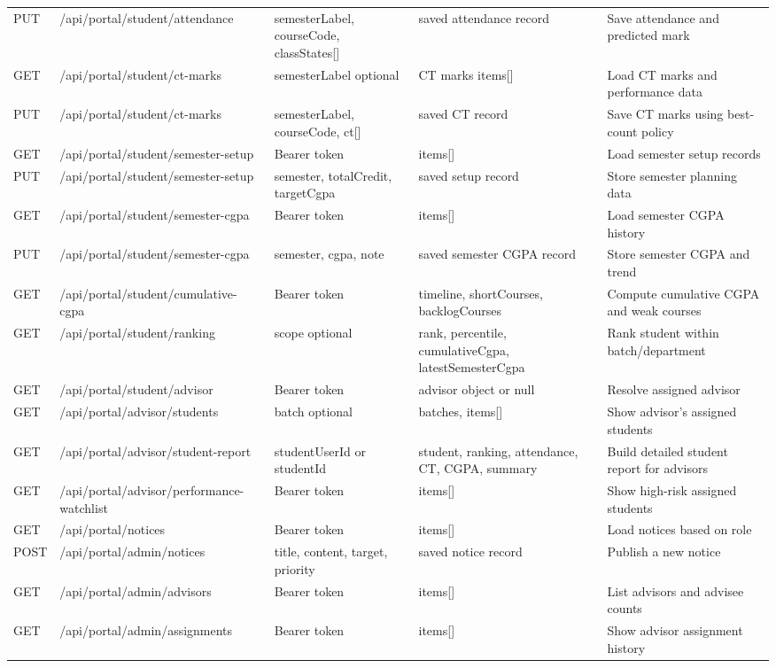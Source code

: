 \documentclass[12pt,a4paper]{article}
\begin{document}
\begin{longtable}{L{1.6cm}L{3.2cm}L{3.4cm}L{5.0cm}L{2.2cm}}
PUT & /api/portal/student/attendance & semesterLabel, courseCode, classStates[] & saved attendance record & Save attendance and predicted mark \\
GET & /api/portal/student/ct-marks & semesterLabel optional & CT marks items[] & Load CT marks and performance data \\
PUT & /api/portal/student/ct-marks & semesterLabel, courseCode, ct[] & saved CT record & Save CT marks using best-count policy \\
GET & /api/portal/student/semester-setup & Bearer token & items[] & Load semester setup records \\
PUT & /api/portal/student/semester-setup & semester, totalCredit, targetCgpa & saved setup record & Store semester planning data \\
GET & /api/portal/student/semester-cgpa & Bearer token & items[] & Load semester CGPA history \\
PUT & /api/portal/student/semester-cgpa & semester, cgpa, note & saved semester CGPA record & Store semester CGPA and trend \\
GET & /api/portal/student/cumulative-cgpa & Bearer token & timeline, shortCourses, backlogCourses & Compute cumulative CGPA and weak courses \\
GET & /api/portal/student/ranking & scope optional & rank, percentile, cumulativeCgpa, latestSemesterCgpa & Rank student within batch/department \\
GET & /api/portal/student/advisor & Bearer token & advisor object or null & Resolve assigned advisor \\
GET & /api/portal/advisor/students & batch optional & batches, items[] & Show advisor's assigned students \\
GET & /api/portal/advisor/student-report & studentUserId or studentId & student, ranking, attendance, CT, CGPA, summary & Build detailed student report for advisors \\
GET & /api/portal/advisor/performance-watchlist & Bearer token & items[] & Show high-risk assigned students \\
GET & /api/portal/notices & Bearer token & items[] & Load notices based on role \\
POST & /api/portal/admin/notices & title, content, target, priority & saved notice record & Publish a new notice \\
GET & /api/portal/admin/advisors & Bearer token & items[] & List advisors and advisee counts \\
GET & /api/portal/admin/assignments & Bearer token & items[] & Show advisor assignment history \\

\end{longtable}
\end{document}
